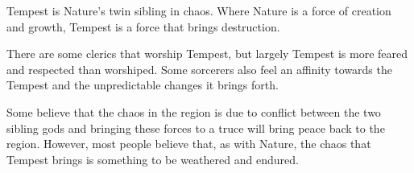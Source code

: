 Tempest is Nature's twin sibling in chaos.
Where Nature is a force of creation and growth, Tempest is a force that brings destruction.

There are some clerics that worship Tempest, but largely Tempest is more feared and respected than worshiped.
Some sorcerers also feel an affinity towards the Tempest and the unpredictable changes it brings forth.

Some believe that the chaos in the region is due to conflict between the two sibling gods and bringing these forces to a truce will bring peace back to the region.
However, most people believe that, as with Nature, the chaos that Tempest brings is something to be weathered and endured.
